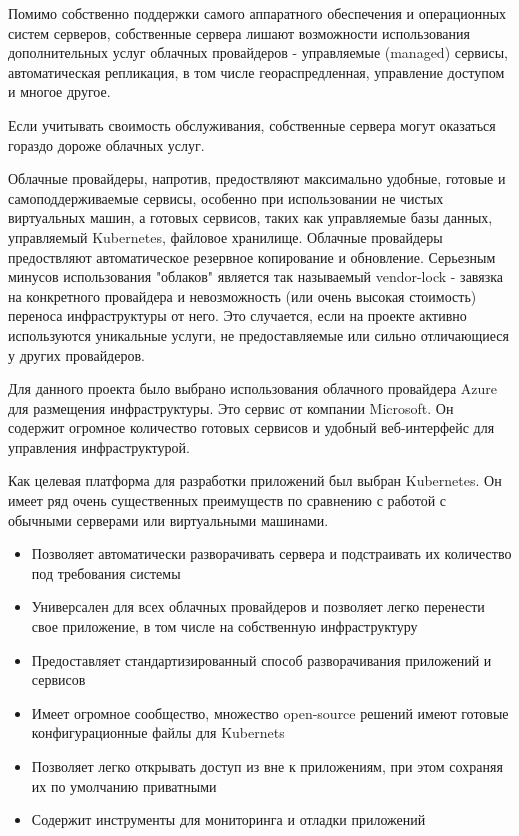 Помимо собственно поддержки самого аппаратного обеспечения и операционных систем серверов, собственные сервера лишают возможности использования дополнительных услуг облачных провайдеров - управляемые (managed) сервисы, автоматическая репликация, в том числе геораспредленная, управление доступом и многое другое.

Если учитывать своимость обслуживания, собственные сервера могут оказаться гораздо дороже облачных услуг.

Облачные провайдеры, напротив, предоствляют максимально удобные, готовые и самоподдерживаемые сервисы, особенно при использовании не чистых виртуальных машин, а готовых сервисов, таких как управляемые базы данных, управляемый Kubernetes, файловое хранилище. Облачные провайдеры предоствляют автоматическое резервное копирование и обновление. Серьезным минусов использования "облаков" является так называемый vendor-lock - завязка на конкретного провайдера и невозможность (или очень высокая стоимость) переноса инфраструктуры от него. Это случается, если на проекте активно используются уникальные услуги, не предоставляемые или сильно отличающиеся у других провайдеров.

Для данного проекта было выбрано использования облачного провайдера Azure для размещения инфраструктуры. Это сервис от компании Microsoft. Он содержит огромное количество готовых сервисов и удобный веб-интерфейс для управления инфраструктурой.

Как целевая платформа для разработки приложений был выбран Kubernetes. Он имеет ряд очень существенных преимуществ по сравнению с работой с обычными серверами или виртуальными машинами.

\begin{itemize}
	\item Позволяет автоматически разворачивать сервера и подстраивать их количество под требования системы
	\item Универсален для всех облачных провайдеров и позволяет легко перенести свое приложение, в том числе на собственную инфраструктуру
	\item Предоставляет стандартизированный способ разворачивания приложений и сервисов
	\item Имеет огромное сообщество, множество open-source решений имеют готовые конфигурационные файлы для Kubernets
	\item Позволяет легко открывать доступ из вне к приложениям, при этом сохраняя их по умолчанию приватными
	\item Содержит инструменты для мониторинга и отладки приложений
\end{itemize}

